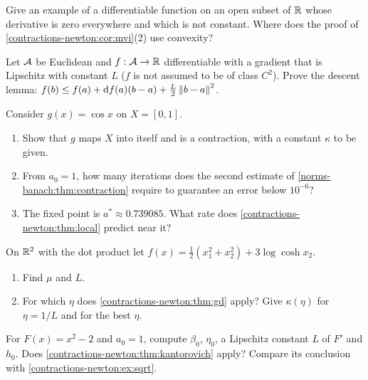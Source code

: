 \begin{notechapter}
\begin{exercise}\label{contractions-newton:exr:3}
Give an example of a differentiable function on an open subset of $\mathbb{R}$
whose derivative is zero everywhere and which is not constant. Where does
the proof of \cref{contractions-newton:cor:mvi}(2) use convexity?
\end{exercise}

\begin{exercise}\label{contractions-newton:exr:4}
Let $\mathcal{A}$ be Euclidean and $f:\mathcal{A}\to\mathbb{R}$ differentiable with a gradient
that is Lipschitz with constant $L$ ($f$ is not assumed to be of class
$C^2$). Prove the descent lemma:
$f(b)\leq f(a) + \mathrm{d} f(a)(b - a) + \frac L2\left\|b - a\right\|^2$.
\end{exercise}

\begin{exercise}\label{contractions-newton:exr:5}
Consider $g(x) = \cos x$ on $X = [0, 1]$.
\begin{enumerate}[nosep]
  \item Show that $g$ maps $X$ into itself and is a contraction, with a
        constant $\kappa$ to be given.
  \item From $a_0 = 1$, how many iterations does the second estimate of
        \cref{norms-banach:thm:contraction} require to guarantee an error
        below $10^{-6}$?
  \item The fixed point is $a^*\approx0.739085$. What rate does
        \cref{contractions-newton:thm:local} predict near it?
\end{enumerate}
\end{exercise}

\begin{exercise}\label{contractions-newton:exr:6}
On $\mathbb{R}^2$ with the dot product let
$f(x) = \frac12(x_1^2 + x_2^2) + 3\log\cosh x_2$.
\begin{enumerate}[nosep]
  \item Find $\mu$ and $L$.
  \item For which $\eta$ does \cref{contractions-newton:thm:gd} apply?
        Give $\kappa(\eta)$ for $\eta = 1/L$ and for the best $\eta$.
\end{enumerate}
\end{exercise}

\begin{exercise}\label{contractions-newton:exr:7}
For $F(x) = x^2 - 2$ and $a_0 = 1$, compute $\beta_0$, $\eta_0$, a
Lipschitz constant $L$ of $F'$ and $h_0$. Does
\cref{contractions-newton:thm:kantorovich} apply? Compare its conclusion
with \cref{contractions-newton:ex:sqrt}.
\end{exercise}


\end{notechapter}
